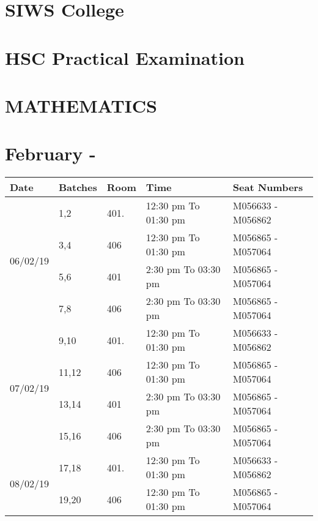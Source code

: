 \documentclass[14pt]{extarticle}
\begin{document}
\section*{SIWS College}
\section*{HSC Practical Examination }
\section*{MATHEMATICS}
\section*{February - \the\year }
\begin{tabular}{ | m{2.5cm} | m{1.8cm}|m{1.4cm}| m{4.8cm} |  m{5cm} | } 
  \hline
  Date
  &Batches
  &Room
  &Time
  & Seat Numbers \\ 
  
   
  \hline
  \multirow{4}{*}{06/02/19 }
  &1,2
  &401.
  &12:30 pm To 01:30 pm 
  &M056633 - M056862 
  \\\cline{2-5}
  
  & 3,4
  &406
  & 12:30 pm To 01:30 pm
  & M056865 - M057064 
  \\\cline{2-5}
  
  & 5,6
  &401
  & 2:30 pm To 03:30 pm
  & M056865 - M057064 
  \\\cline{2-5}
  
  & 7,8
  &406
  & 2:30 pm To 03:30 pm
  & M056865 - M057064
  \\ 
  \hline


   
  
  \multirow{4}{*}{07/02/19 }
  &9,10
  &401.
  &12:30 pm To 01:30 pm 
  &M056633 - M056862 
  \\\cline{2-5}
  
  & 11,12
  &406
  & 12:30 pm To 01:30 pm
  & M056865 - M057064 
  \\\cline{2-5}
  
  & 13,14
  &401
  & 2:30 pm To 03:30 pm
  & M056865 - M057064 
  \\\cline{2-5}
  
  & 15,16
  &406
  & 2:30 pm To 03:30 pm
  & M056865 - M057064
  \\ 
  \hline

   
  
  \multirow{2}{*}{08/02/19 }
  &17,18
  &401.
  &12:30 pm To 01:30 pm 
  &M056633 - M056862 
  \\\cline{2-5}
  
  & 19,20
  &406
  & 12:30 pm To 01:30 pm
  & M056865 - M057064 
 \\ 
  \hline

   

\end{tabular}
\vspace{1cm}
\end{document}
